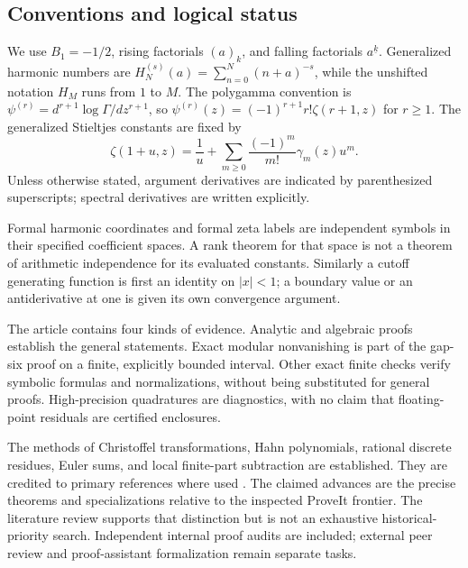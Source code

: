 \documentclass[11pt,a4paper]{article}
\theoremstyle{definition}
\theoremstyle{remark}
\numberwithin{equation}{section}
\begin{document}
\subsection{Conventions and logical status}

We use $B_1=-1/2$, rising factorials $(a)_k$, and falling
factorials $a^{\underline k}$. Generalized harmonic numbers are
$H_N^{(s)}(a)=\sum_{n=0}^N(n+a)^{-s}$, while the unshifted
notation $H_M$ runs from $1$ to $M$. The polygamma convention is
$\psi^{(r)}=d^{r+1}\log\Gamma/dz^{r+1}$, so
$\psi^{(r)}(z)=(-1)^{r+1}r!\zeta(r+1,z)$ for $r\ge1$.
The generalized Stieltjes constants are fixed by
\[
 \zeta(1+u,z)=\frac1u+
       \sum_{m\ge0}\frac{(-1)^m}{m!}\gamma_m(z)u^m.
\]
Unless otherwise stated, argument derivatives are indicated by
parenthesized superscripts; spectral derivatives are written
explicitly.

Formal harmonic coordinates and formal zeta labels are independent
symbols in their specified coefficient spaces. A rank theorem for
that space is not a theorem of arithmetic independence for its
evaluated constants. Similarly a cutoff generating function is
first an identity on $|x|<1$; a boundary value or an antiderivative
at one is given its own convergence argument.

The article contains four kinds of evidence. Analytic and
algebraic proofs establish the general statements. Exact modular
nonvanishing is part of the gap-six proof on a finite, explicitly
bounded interval. Other exact finite checks verify symbolic
formulas and normalizations, without being substituted for general
proofs. High-precision quadratures are diagnostics, with no claim
that floating-point residuals are certified enclosures.

The methods of Christoffel transformations, Hahn polynomials,
rational discrete residues, Euler sums, and local finite-part
subtraction are established. They are credited to primary
references where used \cite{Krattenthaler2023,DLMF,ChenSinger2012,
Xu2017,XuWang2019,ShpotParis2016}. The claimed advances are the
precise theorems and specializations relative to the inspected
ProveIt frontier. The literature review supports that distinction
but is not an exhaustive historical-priority search. Independent
internal proof audits are included; external peer review and
proof-assistant formalization remain separate tasks.



\end{document}
